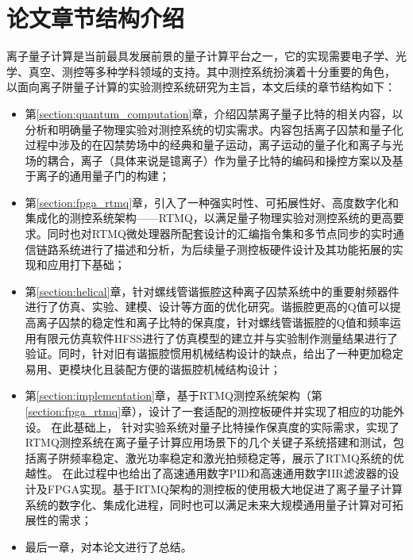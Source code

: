 \section[论文章节结构介绍]{论文章节结构介绍}
离子量子计算是当前最具发展前景的量子计算平台之一，它的实现需要电子学、光学、真空、测控等多种学科领域的支持。其中测控系统扮演着十分重要的角色，
以面向离子阱量子计算的实验测控系统研究为主旨，本文后续的章节结构如下：
\begin{itemize}
    \item 第\ref{section:quantum_computation}章，介绍囚禁离子量子比特的相关内容，以分析和明确量子物理实验对测控系统的切实需求。内容包括离子囚禁和量子化过程中涉及的在囚禁势场中的经典和量子运动，离子运动的量子化和离子与光场的耦合，离子（具体来说是镱离子）作为量子比特的编码和操控方案以及基于离子的通用量子门的构建；
    \item 第\ref{section:fpga_rtmq}章，引入了一种强实时性、可拓展性好、高度数字化和集成化的测控系统架构——RTMQ，以满足量子物理实验对测控系统的更高要求。同时也对RTMQ微处理器所配套设计的汇编指令集和多节点同步的实时通信链路系统进行了描述和分析，为后续量子测控板硬件设计及其功能拓展的实现和应用打下基础；
    \item 第\ref{section:helical}章，针对螺线管谐振腔这种离子囚禁系统中的重要射频器件进行了仿真、实验、建模、设计等方面的优化研究。谐振腔更高的Q值可以提高离子囚禁的稳定性和离子比特的保真度，针对螺线管谐振腔的Q值和频率运用有限元仿真软件HFSS进行了仿真模型的建立并与实验制作测量结果进行了验证。同时，针对旧有谐振腔惯用机械结构设计的缺点，给出了一种更加稳定易用、更模块化且装配方便的谐振腔机械结构设计；
    \item 第\ref{section:implementation}章，基于RTMQ测控系统架构（第\ref{section:fpga_rtmq}章），设计了一套适配的测控板硬件并实现了相应的功能外设。
    在此基础上，
    针对实验系统对量子比特操作保真度的实际需求，实现了RTMQ测控系统在离子量子计算应用场景下的几个关键子系统搭建和测试，包括离子阱频率稳定、激光功率稳定和激光拍频稳定等，展示了RTMQ系统的优越性。
    在此过程中也给出了高速通用数字PID和高速通用数字IIR滤波器的设计及FPGA实现。基于RTMQ架构的测控板的使用极大地促进了离子量子计算系统的数字化、集成化进程，同时也可以满足未来大规模通用量子计算对可拓展性的需求；
    \item 最后一章，对本论文进行了总结。
\end{itemize}